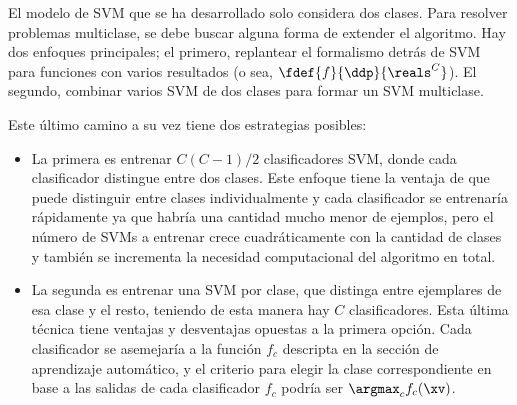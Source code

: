 El modelo de SVM que se ha desarrollado solo considera dos clases. Para resolver problemas multiclase, se debe buscar alguna forma de extender el algoritmo. Hay dos enfoques principales; el primero, replantear el formalismo detrás de SVM para funciones con varios resultados (o sea, $\fdef{f}{\ddp}{\reals^C}$). El segundo, combinar varios SVM de dos clases para formar un SVM multiclase.

Este último camino a su vez tiene dos estrategias posibles:

\begin{itemize}
\item La primera es entrenar $C(C-1)/2$ clasificadores SVM, donde cada clasificador distingue entre dos clases. Este enfoque tiene la ventaja de que puede distinguir entre clases individualmente y cada clasificador se entrenaría rápidamente ya que habría una cantidad mucho menor de ejemplos, pero el número de SVMs a entrenar crece cuadráticamente con la cantidad de clases y también se incrementa la necesidad computacional del algoritmo en total.

\item La segunda es entrenar una SVM por clase, que distinga entre ejemplares de esa clase y el resto, teniendo de esta manera hay $C$ clasificadores. Esta última técnica tiene ventajas y desventajas opuestas a la primera opción. Cada clasificador se asemejaría a la función $f_c$ descripta en la sección de aprendizaje automático, y el criterio para elegir la clase correspondiente en base a las salidas de cada clasificador $f_c$ podría ser $ \argmax_c f_c(\xv)$.

\end{itemize}
